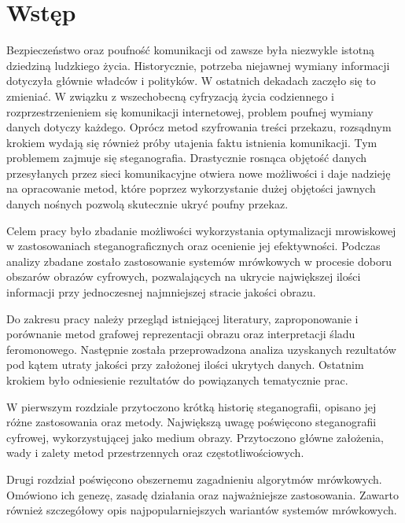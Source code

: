 
\chapter*{Wstęp}\label{chap:intro}
{
    Bezpieczeństwo oraz poufność komunikacji od zawsze była niezwykle istotną dziedziną ludzkiego życia. Historycznie,
    potrzeba niejawnej wymiany informacji dotyczyła głównie władców i polityków. W ostatnich dekadach zaczęło się to
    zmieniać. W związku z wszechobecną cyfryzacją życia codziennego i rozprzestrzenieniem się komunikacji internetowej,
    problem poufnej wymiany danych dotyczy każdego. Oprócz metod szyfrowania treści przekazu, rozsądnym krokiem wydają
    się również próby utajenia faktu istnienia komunikacji. Tym problemem zajmuje się steganografia. Drastycznie rosnąca
    objętość danych przesyłanych przez sieci komunikacyjne otwiera nowe możliwości i daje nadzieję na opracowanie metod,
    które poprzez wykorzystanie dużej objętości jawnych danych nośnych pozwolą skutecznie ukryć poufny przekaz.

    Celem pracy było zbadanie możliwości wykorzystania optymalizacji mrowiskowej w zastosowaniach steganograficznych
    oraz ocenienie jej efektywności. Podczas analizy zbadane zostało zastosowanie systemów mrówkowych w procesie doboru
    obszarów obrazów cyfrowych, pozwalających na ukrycie największej ilości informacji przy jednoczesnej najmniejszej
    stracie jakości obrazu.

    Do zakresu pracy należy przegląd istniejącej literatury, zaproponowanie i porównanie metod grafowej reprezentacji
    obrazu oraz interpretacji śladu feromonowego. Następnie została przeprowadzona analiza uzyskanych rezultatów pod
    kątem utraty jakości przy założonej ilości ukrytych danych. Ostatnim krokiem było odniesienie rezultatów do
    powiązanych tematycznie prac.

    W pierwszym rozdziale przytoczono krótką historię steganografii, opisano jej różne zastosowania oraz metody.
    Największą uwagę poświęcono steganografii cyfrowej, wykorzystującej jako medium obrazy. Przytoczono główne
    założenia, wady i zalety metod przestrzennych oraz częstotliwościowych.

    Drugi rozdział poświęcono obszernemu zagadnieniu algorytmów mrówkowych. Omówiono ich genezę, zasadę działania oraz
    najważniejsze zastosowania. Zawarto również szczegółowy opis najpopularniejszych wariantów systemów mrówkowych.

}
